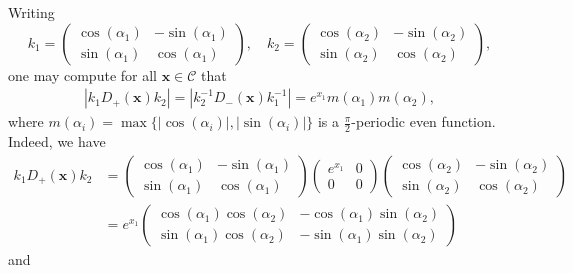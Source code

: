 \documentclass[11pt,reqno]{amsart}
\theoremstyle{definition}
\theoremstyle{remark}
\numberwithin{equation}{section}
\numberwithin{thm}{section}
\numberwithin{table}{section}
\newcommand{\x}{\mathbf{x}}
\begin{document}
    Writing 
    \[
    k_1 = \begin{pmatrix}
        \cos (\alpha_1) & -\sin (\alpha_1) \\
        \sin(\alpha_1) & \cos(\alpha_1)
    \end{pmatrix}, \quad 
    k_2 = \begin{pmatrix}
        \cos (\alpha_2) & -\sin (\alpha_2) \\
        \sin(\alpha_2) & \cos(\alpha_2)
    \end{pmatrix},
    \]
    one may compute for all $\x \in \mathcal{C}$ that  
    \begin{align*}
          |k_1 D_+(\x) k_2| 
          = |  k_2^{-1} D_-(\mathbf{x}) k_1^{-1} | 
          = e^{x_1} m(\alpha_1)m(\alpha_2), 
    \end{align*}
    where 
    $m(\alpha_i) = \max 
          \{
          |\cos(\alpha_i)|, |\sin(\alpha_i)|
          \}$  is a $\tfrac{\pi}{2}$-periodic even function. 
    Indeed, we have 
    \begin{align*}
         k_1 D_+(\x) k_2
    &= 
    \begin{pmatrix}
        \cos (\alpha_1) & -\sin (\alpha_1) \\
        \sin(\alpha_1) & \cos(\alpha_1)
    \end{pmatrix}
     \begin{pmatrix}
        e^{x_1} & 0 \\
        0 & 0
    \end{pmatrix}
    \begin{pmatrix}
        \cos (\alpha_2) & -\sin (\alpha_2) \\
        \sin(\alpha_2) & \cos(\alpha_2)
    \end{pmatrix} \\
    &=
    e^{x_1}
    \begin{pmatrix}
        \cos (\alpha_1)
        \cos (\alpha_2)& -\cos (\alpha_1)\sin (\alpha_2) \\
        \sin (\alpha_1)\cos (\alpha_2) & -\sin (\alpha_1)\sin (\alpha_2)
    \end{pmatrix}
    \end{align*}
   and 
\end{document}
